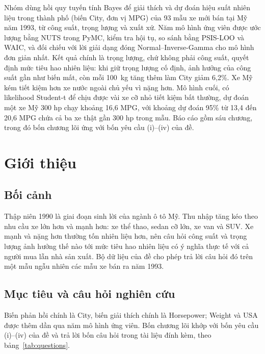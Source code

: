 \documentclass[12pt,a4paper]{report}
\begin{document}
Nhóm dùng hồi quy tuyến tính Bayes để giải thích và dự đoán hiệu suất nhiên liệu
trong thành phố (biến City, đơn vị MPG) của 93 mẫu xe mới bán tại Mỹ năm 1993,
từ công suất, trọng lượng và xuất xứ. Năm mô hình ứng viên được ước lượng bằng
NUTS trong PyMC, kiểm tra hội tụ, so sánh bằng PSIS-LOO và WAIC, và đối chiếu
với lời giải dạng đóng Normal--Inverse-Gamma cho mô hình đơn giản nhất. Kết
quả chính là trọng lượng, chứ không phải công suất, quyết định mức tiêu hao
nhiên liệu: khi giữ trọng lượng cố định, ảnh hưởng của công suất gần như biến
mất, còn mỗi \SI{100}{kg} tăng thêm làm City giảm 6{,}2\%. Xe Mỹ kém tiết kiệm
hơn xe nước ngoài chủ yếu vì nặng hơn. Mô hình cuối, có likelihood Student-t
để chịu được vài xe cỡ nhỏ tiết kiệm bất thường, dự đoán một xe Mỹ 300 hp chạy
khoảng 16{,}6 MPG, với khoảng dự đoán 95\% từ 13{,}4 đến 20{,}6 MPG chứa cả ba
xe thật gần 300 hp trong mẫu. Báo cáo gồm sáu chương, trong đó bốn chương lõi
ứng với bốn yêu cầu (i)--(iv) của đề.

\tableofcontents
\pagebreak

\listoffigures
\listoftables
\newpage

\chapter{Giới thiệu}
\label{sec:intro}

\section{Bối cảnh}

Thập niên 1990 là giai đoạn sinh lời của ngành ô tô Mỹ. Thu nhập tăng kéo theo
nhu cầu xe lớn hơn và mạnh hơn: xe thể thao, sedan cỡ lớn, xe van và SUV. Xe
mạnh và nặng hơn thường tốn nhiên liệu hơn, nên câu hỏi công suất và trọng lượng
ảnh hưởng thế nào tới mức tiêu hao nhiên liệu có ý nghĩa thực tế với cả người
mua lẫn nhà sản xuất. Bộ dữ liệu của đề cho phép trả lời câu hỏi đó trên một mẫu
ngẫu nhiên các mẫu xe bán ra năm 1993.

\section{Mục tiêu và câu hỏi nghiên cứu}

Biến phản hồi chính là City, biến giải thích chính là Horsepower; Weight và USA
được thêm dần qua năm mô hình ứng viên. Bốn chương lõi khớp với bốn yêu cầu
(i)--(iv) của đề và trả lời bốn câu hỏi trong tài liệu đính kèm, theo
bảng~\ref{tab:questions}.
\end{document}
